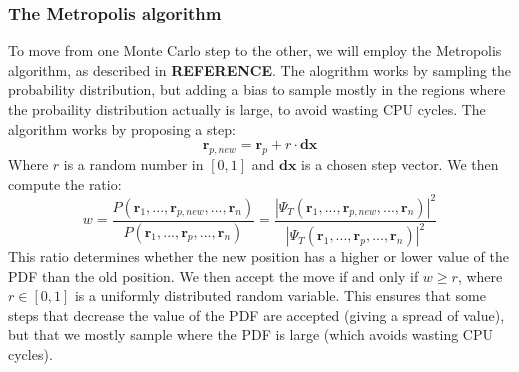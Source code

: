 \documentclass[a4paper, 10pt]{article}
\begin{document}
\subsubsection{The Metropolis algorithm}
To move from one Monte Carlo step to the other, we will employ the Metropolis algorithm, as described in \textbf{REFERENCE}. The alogrithm works by sampling the probability distribution, but adding a bias to sample mostly in the regions where the probaility distribution actually is large, to avoid wasting CPU cycles. The algorithm works by proposing a step:
\begin{equation}
\boldsymbol{r}_{p, new}=\boldsymbol{r}_p+r \cdot \boldsymbol{dx}
\end{equation}
Where $r$ is a random number in $[0,1]$ and $\boldsymbol{dx}$ is a chosen step vector. We then compute the ratio:
\begin{equation}
w=\frac{P(\boldsymbol{r}_1, ..., \boldsymbol{r}_{p,new}, ..., \boldsymbol{r}_n)}{P(\boldsymbol{r}_1, ..., \boldsymbol{r}_{p}, ..., \boldsymbol{r}_n)}=\frac{|\Psi_T(\boldsymbol{r}_1, ..., \boldsymbol{r}_{p,new}, ..., \boldsymbol{r}_n)|^2}{|\Psi_T(\boldsymbol{r}_1, ..., \boldsymbol{r}_{p}, ..., \boldsymbol{r}_n)|^2}
\end{equation}
This ratio determines whether the new position has a higher or lower value of the PDF than the old position. We then accept the move if and only if $w\geq r$, where $r\in [0,1]$ is a uniformly distributed random variable. This ensures that some steps that decrease the value of the PDF are accepted (giving a spread of value), but that we mostly sample where the PDF is large (which avoids wasting CPU cycles).
\end{document}
